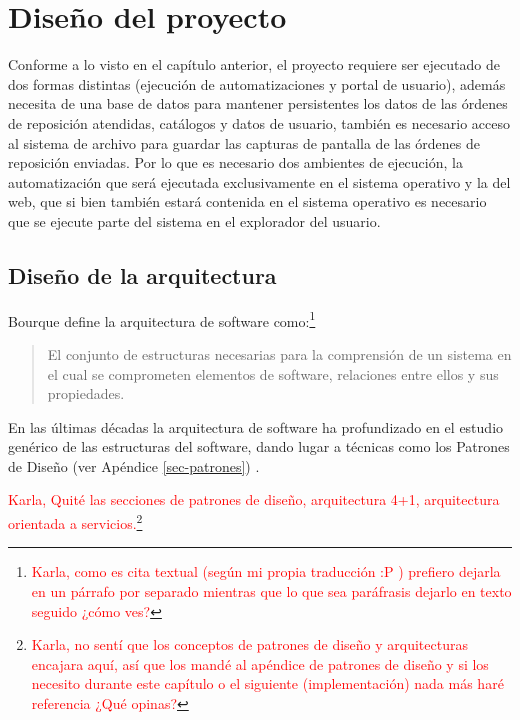 \chapter{Diseño del proyecto}\label{cap3}
Conforme a lo visto en el capítulo anterior, el proyecto requiere ser ejecutado de dos formas distintas (ejecución de automatizaciones y portal de usuario), además necesita de una base de datos para mantener persistentes los datos de las órdenes de reposición atendidas, catálogos y datos de usuario, también es necesario acceso al sistema de archivo para guardar las capturas de pantalla de las órdenes de reposición enviadas. Por lo que es necesario dos ambientes de ejecución, la automatización que será ejecutada exclusivamente en el sistema operativo y la del web, que si bien también estará contenida en el sistema operativo es necesario que se ejecute parte del sistema en el explorador del usuario.




\section{Diseño de la arquitectura}
Bourque define la arquitectura de software como:\footnote{\textcolor{red}{Karla, como es cita textual (según mi propia traducción :P ) prefiero dejarla en un párrafo por separado mientras que lo que sea paráfrasis dejarlo en texto seguido ¿cómo ves?}}
\begin{quote}
	El conjunto de estructuras necesarias para la comprensión de un sistema en el cual se comprometen elementos de software, relaciones entre ellos y sus propiedades\cite{SWEBOOK}.
\end{quote}
En las últimas décadas la arquitectura de software ha profundizado en el estudio genérico de las estructuras del software, dando lugar a técnicas como los Patrones de Diseño (ver Apéndice \ref{sec-patrones}) \cite{SWEBOOK, SoftwareArchitectureInAction}.

\textcolor{red}{Karla, Quité las secciones de patrones de diseño, arquitectura 4+1, arquitectura orientada a servicios.}\footnote{\textcolor{red}{Karla, no sentí que los conceptos de patrones de diseño y arquitecturas encajara aquí, así que los mandé al apéndice de patrones de diseño y si los necesito durante este capítulo o el siguiente (implementación) nada más haré referencia ¿Qué opinas?}}

